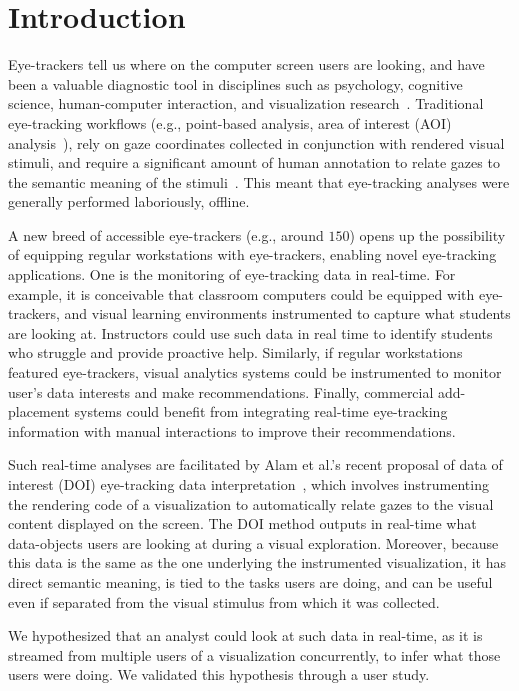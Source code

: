 \section{Introduction}

Eye-trackers tell us where on the computer screen users are looking, and have been a valuable diagnostic tool in disciplines such as psychology, cognitive science, human-computer interaction, and visualization research~\cite{duchowski2002breadth}. Traditional eye-tracking workflows (e.g., point-based analysis, area of interest (AOI) analysis~\cite{blascheckstate}), rely on gaze coordinates collected in conjunction with rendered visual stimuli, and require a significant amount of human annotation to relate gazes to the semantic meaning of the stimuli~\cite{alamdata}. This meant  that eye-tracking analyses were generally performed laboriously, offline.  

A new breed of accessible eye-trackers (e.g., around $150$) opens up the possibility of equipping regular workstations with eye-trackers, enabling novel eye-tracking applications. One is the monitoring of eye-tracking data in real-time. For example, it is conceivable that classroom computers could be equipped with eye-trackers, and visual learning environments instrumented to capture what students are looking at. Instructors could use such data in real time to identify students who struggle and provide proactive help. Similarly, if regular workstations featured eye-trackers, visual analytics systems could be instrumented to monitor user’s data interests and make recommendations. Finally, commercial add-placement systems could benefit from integrating real-time eye-tracking information with manual interactions to improve their recommendations.

Such real-time analyses are facilitated by  Alam et al.'s recent proposal of data of interest (DOI) eye-tracking data interpretation~\cite{alamdata}, which involves instrumenting the rendering code of a visualization to automatically relate gazes to the visual content displayed on the screen. The DOI method outputs in real-time what data-objects users are looking at during a visual exploration. Moreover, because this data is the same as the one underlying the instrumented visualization, it has direct semantic meaning, is tied to the tasks users are doing, and can be useful even if separated from the visual stimulus from which it was collected. 

We hypothesized that an analyst could look at such data in real-time, as it is streamed from multiple users of a visualization concurrently, to infer what those users were doing. We validated this hypothesis through a user study.   
 

 
